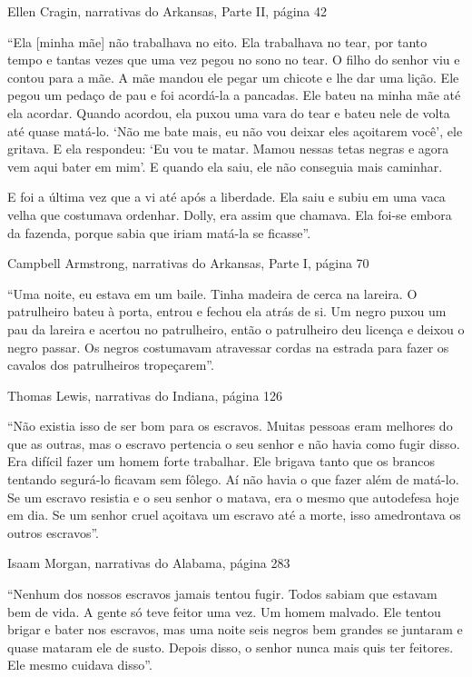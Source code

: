 Ellen Cragin, narrativas do Arkansas, Parte II, página 42

``Ela {[}minha mãe{]} não trabalhava no eito. Ela trabalhava no tear,
por tanto tempo e tantas vezes que uma vez pegou no sono no tear. O
filho do senhor viu e contou para a mãe. A mãe mandou ele pegar um
chicote e lhe dar uma lição. Ele pegou um pedaço de pau e foi acordá-la
a pancadas. Ele bateu na minha mãe até ela acordar. Quando acordou, ela
puxou uma vara do tear e bateu nele de volta até quase matá-lo. `Não me
bate mais, eu não vou deixar eles açoitarem você', ele gritava. E ela
respondeu: `Eu vou te matar. Mamou nessas tetas negras e agora vem aqui
bater em mim'. E quando ela saiu, ele não conseguia mais caminhar.

E foi a última vez que a vi até após a liberdade. Ela saiu e subiu em
uma vaca velha que costumava ordenhar. Dolly, era assim que chamava. Ela
foi-se embora da fazenda, porque sabia que iriam matá-la se ficasse''.

Campbell Armstrong, narrativas do Arkansas, Parte I, página 70

``Uma noite, eu estava em um baile. Tinha madeira de cerca na lareira. O
patrulheiro bateu à porta, entrou e fechou ela atrás de si. Um negro
puxou um pau da lareira e acertou no patrulheiro, então o patrulheiro
deu licença e deixou o negro passar. Os negros costumavam atravessar
cordas na estrada para fazer os cavalos dos patrulheiros tropeçarem''.

Thomas Lewis, narrativas do Indiana, página 126

``Não existia isso de ser bom para os escravos. Muitas pessoas eram
melhores do que as outras, mas o escravo pertencia o seu senhor e não
havia como fugir disso. Era difícil fazer um homem forte trabalhar. Ele
brigava tanto que os brancos tentando segurá-lo ficavam sem fôlego. Aí
não havia o que fazer além de matá-lo. Se um escravo resistia e o seu
senhor o matava, era o mesmo que autodefesa hoje em dia. Se um senhor
cruel açoitava um escravo até a morte, isso amedrontava os outros
escravos''.

Isaam Morgan, narrativas do Alabama, página 283

``Nenhum dos nossos escravos jamais tentou fugir. Todos sabiam que
estavam bem de vida. A gente só teve feitor uma vez. Um homem malvado.
Ele tentou brigar e bater nos escravos, mas uma noite seis negros bem
grandes se juntaram e quase mataram ele de susto. Depois disso, o senhor
nunca mais quis ter feitores. Ele mesmo cuidava disso''.

